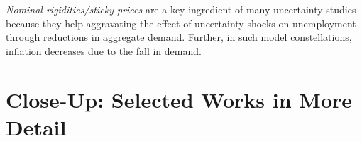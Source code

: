 \documentclass[a4paper,11pt,listof=nochaptergap,oneside,pointednumbers,bibtotoc,bigheadings,liststotoc]{scrbook}
\theoremstyle{mysatz}
\theoremstyle{mydefinition}
\theoremstyle{mytheorem}
\theoremstyle{mybemerkung}
\begin{document}
\textit{Nominal rigidities/sticky prices} are a key ingredient of many uncertainty studies because they help aggravating the effect of uncertainty shocks on unemployment through reductions in aggregate demand. Further, in such model constellations, inflation decreases due to the fall in demand.


\section[Close-Up: Selected Works in More Detail]{Close-Up: Selected Works in More Detail}
\label{sec:selectedworkindetail}
\end{document}
